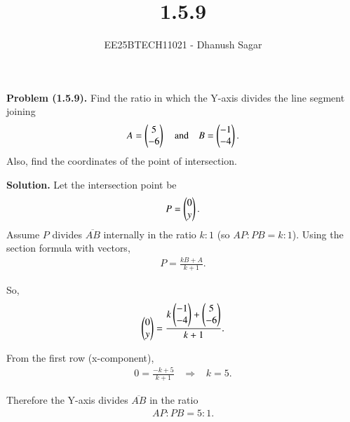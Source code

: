 \documentclass[journal]{IEEEtran}
\begin{document}



\title{1.5.9}
\author{EE25BTECH11021 - Dhanush Sagar
}
{\let\newpage\relax\maketitle}

\renewcommand{\thefigure}{\theenumi}
\renewcommand{\thetable}{\theenumi}
\setlength{\intextsep}{10pt} %


\renewcommand{\thetable}{\theenumi}



\textbf{Problem (1.5.9).} Find the ratio in which the Y-axis divides the line segment joining
\begin{align}
    A=\begin{pmatrix}5\\-6\end{pmatrix} \quad \text{and} \quad B=\begin{pmatrix}-1\\-4\end{pmatrix}.
\end{align}
Also, find the coordinates of the point of intersection.


\textbf{Solution.}  
Let the intersection point be 
\begin{align}
P=\begin{pmatrix}0\\y\end{pmatrix}.
\end{align}
Assume \(P\) divides \(\overline{AB}\) internally in the ratio \(k:1\) (so \(AP:PB=k:1\)).  
Using the section formula with vectors,
\begin{align}
P=\frac{kB+A}{k+1}.
\end{align}

So,
\begin{align}
\begin{pmatrix}0\\y\end{pmatrix} 
= \frac{k\begin{pmatrix}-1\\-4\end{pmatrix}+\begin{pmatrix}5\\-6\end{pmatrix}}{k+1}.
\end{align}

From the first row (x-component),
\begin{align}
0=\frac{-k+5}{k+1} \;\;\;\Longrightarrow\;\;\; k=5.
\end{align}

Therefore the Y-axis divides \(\overline{AB}\) in the ratio
\begin{align}
AP:PB=5:1.
\end{align}
\end{document}
